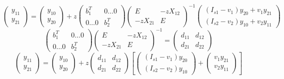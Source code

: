 \documentclass[a4paper,article,14pt]{extarticle}
\begin{document}
\begin{equation}
    \begin{pmatrix} y_{11}\\ y_{21} \end{pmatrix}
    = 
    \begin{pmatrix} y_{10}\\ y_{20} \end{pmatrix}
    + z
    \begin{pmatrix}
         b_{1}^{T} & 0 \dotsc 0 \\
         0 \dotsc 0 & b_{2}^{T}
    \end{pmatrix}
    \begin{pmatrix}
        E & -z X_{12} \\
        -z X_{21} & E
    \end{pmatrix}^{-1}
    \begin{pmatrix}
        (I_{s1} - v_{1}) y_{20} + v_{1} y_{21} \\
        (I_{s2} - v_{2}) y_{10} + v_{2} y_{11}
    \end{pmatrix}
\end{equation}
\begin{equation}
\begin{pmatrix}
         b_{1}^{T} & 0 \dotsc 0 \\
         0 \dotsc 0 & b_{2}^{T}
    \end{pmatrix}
    \begin{pmatrix}
        E & -z X_{12} \\
        -z X_{21} & E
    \end{pmatrix}^{-1}
=
\begin{pmatrix}
    d_{11} & d_{12} \\
    d_{21} & d_{22}
\end{pmatrix}
\end{equation}
\begin{equation}
    \begin{pmatrix} y_{11}\\ y_{21} \end{pmatrix}
    = 
    \begin{pmatrix} y_{10}\\ y_{20} \end{pmatrix}
    + z
    \begin{pmatrix}
    d_{11} & d_{12} \\
    d_{21} & d_{22}
    \end{pmatrix}
    \left[
    \begin{pmatrix}
        (I_{s1} - v_{1}) y_{20} \\
        (I_{s2} - v_{2}) y_{10} 
    \end{pmatrix}
    +
    \begin{pmatrix}
        v_{1} y_{21} \\
        v_{2} y_{11} 
    \end{pmatrix}
    \right]
\end{equation}
\end{document}
